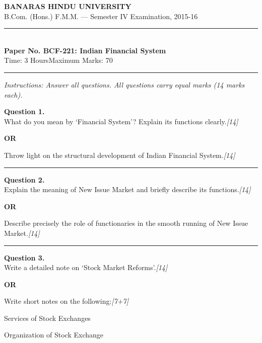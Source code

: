 \documentclass[11pt,a4paper]{article}
\newcommand{\pts}[1]{\hfill   \textit{[#1]}}
\begin{document}
\begin{center}
  {\large\bfseries BANARAS HINDU UNIVERSITY}\\[2pt]
  {\normalsize B.Com. (Hons.) F.M.M. --- Semester IV Examination, 2015-16}\\[6pt]
  \rule{0.8\linewidth}{0.5pt}\\[6pt]
  {\large\bfseries Paper No. BCF-221: Indian Financial System}\\[4pt]
  {\normalsize Time: 3 Hours\hfill Maximum Marks: 70}
\end{center}

\rule{\linewidth}{0.4pt}

\smallskip



\noindent   \textit{Instructions: Answer all questions. All questions carry equal marks (14 marks each).}

\bigskip




\noindent   \textbf{Question 1.} \\
What do you mean by `Financial System'? Explain its functions clearly.\pts{14}

\centerline{   \textbf{OR}}

Throw light on the structural development of Indian Financial System.\pts{14}

\medskip\rule{\linewidth}{0.2pt}




\noindent   \textbf{Question 2.} \\
Explain the meaning of New Issue Market and briefly describe its functions.\pts{14}

\centerline{   \textbf{OR}}

Describe precisely the role of functionaries in the smooth running of New Issue Market.\pts{14}

\medskip\rule{\linewidth}{0.2pt}

\pagebreak




\noindent   \textbf{Question 3.} \\
Write a detailed note on `Stock Market Reforms'.\pts{14}

\centerline{   \textbf{OR}}

Write short notes on the following:\pts{7+7}

\begin{parts}
  \item Services of Stock Exchanges
  \item Organization of Stock Exchange
\end{parts}
\end{document}
